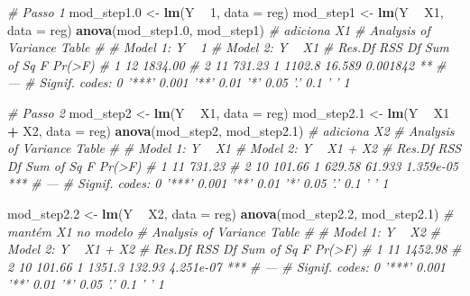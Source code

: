 \documentclass[
]{book}
\newenvironment{Shaded}{\begin{snugshade}}{\end{snugshade}}
\newcommand{\CommentTok}[1]{\textcolor[rgb]{0.56,0.35,0.01}{\textit{#1}}}
\newcommand{\DataTypeTok}[1]{\textcolor[rgb]{0.13,0.29,0.53}{#1}}
\newcommand{\DecValTok}[1]{\textcolor[rgb]{0.00,0.00,0.81}{#1}}
\newcommand{\FloatTok}[1]{\textcolor[rgb]{0.00,0.00,0.81}{#1}}
\newcommand{\KeywordTok}[1]{\textcolor[rgb]{0.13,0.29,0.53}{\textbf{#1}}}
\newcommand{\NormalTok}[1]{#1}
\newcommand{\OperatorTok}[1]{\textcolor[rgb]{0.81,0.36,0.00}{\textbf{#1}}}
\newcommand{\StringTok}[1]{\textcolor[rgb]{0.31,0.60,0.02}{#1}}
\begin{document}
\begin{Shaded}
\begin{Highlighting}[]
\CommentTok{# Passo 1}
\NormalTok{mod_step1}\FloatTok{.0}\NormalTok{ <-}\StringTok{ }\KeywordTok{lm}\NormalTok{(Y }\OperatorTok{~}\StringTok{ }\DecValTok{1}\NormalTok{, }\DataTypeTok{data =}\NormalTok{ reg)}
\NormalTok{mod_step1 <-}\StringTok{ }\KeywordTok{lm}\NormalTok{(Y }\OperatorTok{~}\StringTok{ }\NormalTok{X1, }\DataTypeTok{data =}\NormalTok{ reg)}
\KeywordTok{anova}\NormalTok{(mod_step1}\FloatTok{.0}\NormalTok{, mod_step1) }\CommentTok{# adiciona X1}
\CommentTok{# Analysis of Variance Table}
\CommentTok{# }
\CommentTok{# Model 1: Y ~ 1}
\CommentTok{# Model 2: Y ~ X1}
\CommentTok{#   Res.Df     RSS Df Sum of Sq      F   Pr(>F)   }
\CommentTok{# 1     12 1834.00                                }
\CommentTok{# 2     11  731.23  1    1102.8 16.589 0.001842 **}
\CommentTok{# ---}
\CommentTok{# Signif. codes:  0 '***' 0.001 '**' 0.01 '*' 0.05 '.' 0.1 ' ' 1}

\CommentTok{# Passo 2}
\NormalTok{mod_step2 <-}\StringTok{ }\KeywordTok{lm}\NormalTok{(Y }\OperatorTok{~}\StringTok{ }\NormalTok{X1, }\DataTypeTok{data =}\NormalTok{ reg)}
\NormalTok{mod_step2}\FloatTok{.1}\NormalTok{ <-}\StringTok{ }\KeywordTok{lm}\NormalTok{(Y }\OperatorTok{~}\StringTok{ }\NormalTok{X1 }\OperatorTok{+}\StringTok{ }\NormalTok{X2, }\DataTypeTok{data =}\NormalTok{ reg)}
\KeywordTok{anova}\NormalTok{(mod_step2, mod_step2}\FloatTok{.1}\NormalTok{) }\CommentTok{# adiciona X2}
\CommentTok{# Analysis of Variance Table}
\CommentTok{# }
\CommentTok{# Model 1: Y ~ X1}
\CommentTok{# Model 2: Y ~ X1 + X2}
\CommentTok{#   Res.Df    RSS Df Sum of Sq      F    Pr(>F)    }
\CommentTok{# 1     11 731.23                                  }
\CommentTok{# 2     10 101.66  1    629.58 61.933 1.359e-05 ***}
\CommentTok{# ---}
\CommentTok{# Signif. codes:  0 '***' 0.001 '**' 0.01 '*' 0.05 '.' 0.1 ' ' 1}

\NormalTok{mod_step2}\FloatTok{.2}\NormalTok{ <-}\StringTok{ }\KeywordTok{lm}\NormalTok{(Y }\OperatorTok{~}\StringTok{ }\NormalTok{X2, }\DataTypeTok{data =}\NormalTok{ reg)}
\KeywordTok{anova}\NormalTok{(mod_step2}\FloatTok{.2}\NormalTok{, mod_step2}\FloatTok{.1}\NormalTok{) }\CommentTok{# mantém X1 no modelo}
\CommentTok{# Analysis of Variance Table}
\CommentTok{# }
\CommentTok{# Model 1: Y ~ X2}
\CommentTok{# Model 2: Y ~ X1 + X2}
\CommentTok{#   Res.Df     RSS Df Sum of Sq      F    Pr(>F)    }
\CommentTok{# 1     11 1452.98                                  }
\CommentTok{# 2     10  101.66  1    1351.3 132.93 4.251e-07 ***}
\CommentTok{# ---}
\CommentTok{# Signif. codes:  0 '***' 0.001 '**' 0.01 '*' 0.05 '.' 0.1 ' ' 1}


\end{Highlighting}
\end{Shaded}
\end{document}
